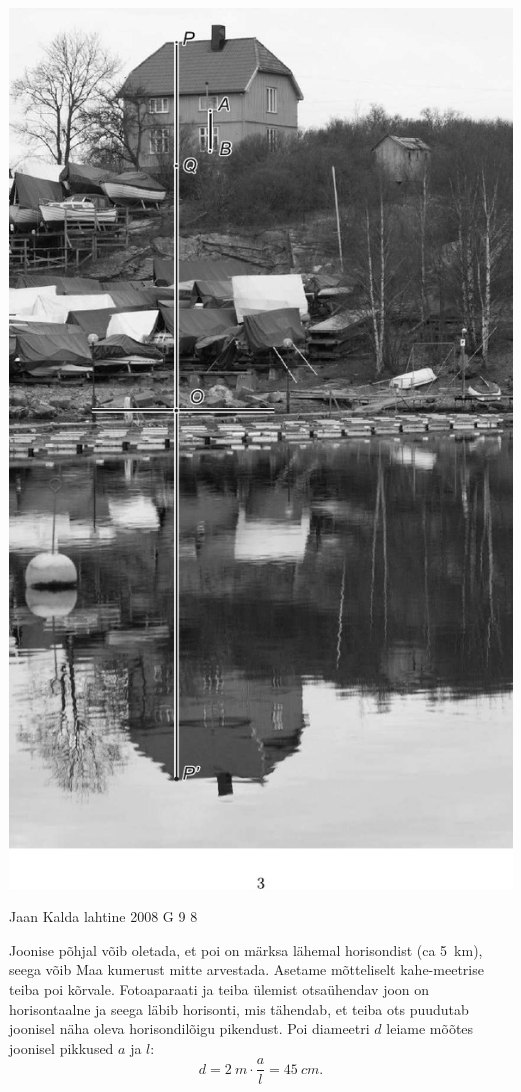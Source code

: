\documentclass[11pt, twoside]{article}
\begin{document}
{{\begin{center}
	\includegraphics[height=\textheight]{2008-v3g-04-lah}
\end{center}
\fi
}

{Jaan Kalda} %
{lahtine} %
{2008} %
{G 9} %
{8} %
{

\ifSolution
Joonise põhjal võib oletada, et poi on märksa lähemal horisondist (ca \SI{5}{km}), seega võib Maa kumerust mitte arvestada. Asetame mõtteliselt kahe-meetrise teiba poi kõrvale. Fotoaparaati ja teiba ülemist otsaühendav joon on horisontaalne ja seega läbib horisonti, mis tähendab, et teiba ots puudutab joonisel näha oleva horisondilõigu pikendust. Poi diameetri $d$ leiame mõõtes joonisel pikkused $a$ ja $l$:
\[
d = \SI{2}{m} \cdot \frac al = \SI{45}{cm}.
\]

}}
\end{document}
